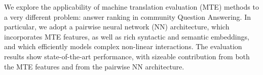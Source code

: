 We explore the applicability of machine translation evaluation (MTE) methods to a very different problem: answer ranking in community Question Answering. In particular, we adopt a pairwise neural network (NN) architecture, which incorporates MTE features, as well as rich syntactic and semantic embeddings, and which efficiently models complex non-linear interactions. The evaluation results show state-of-the-art performance, with sizeable contribution from both the MTE features and from the pairwise NN architecture.
